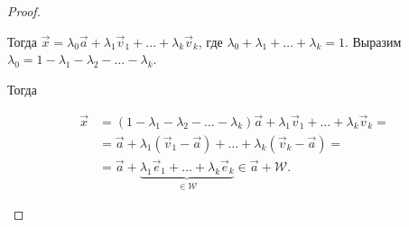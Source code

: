 \begin{proof}
\begin{enumerate}
        Тогда $\vec{x} = \lambda_0\vec{a} + \lambda_1\vec{v}_1 + \ldots + \lambda_k\vec{v}_k$, где $\lambda_0 + \lambda_1 + \ldots + \lambda_k = 1$. Выразим $\lambda_0 = 1 - \lambda_1 - \lambda_2 - \ldots - \lambda_k$.

        Тогда

        \begin{align*}
            \vec{x} &= (1 - \lambda_1 - \lambda_2 - \ldots - \lambda_k)\vec{a} + \lambda_1\vec{v}_1 + \ldots + \lambda_k\vec{v}_k = \\
            &= \vec{a} + \lambda_1(\vec{v}_1 - \vec{a}) + \ldots + \lambda_k(\vec{v}_k - \vec{a}) = \\
            &= \vec{a} + \underbrace{\lambda_1\vec{e}_1 + \ldots + \lambda_k\vec{e}_k}_{\in \mathcal{W}} \in \vec{a} + \mathcal{W}.
        \end{align*}
    \end{enumerate}
\end{proof}
